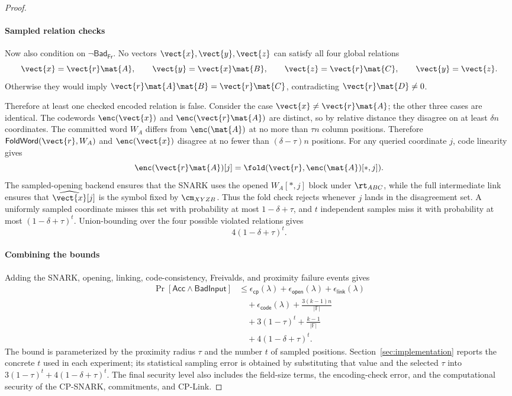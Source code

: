 \begin{proof}
\paragraph{Sampled relation checks}
Now also condition on \(\neg\mathsf{Bad}_{\mathsf{Fr}}\).  No vectors
\(\vect{x},\vect{y},\vect{z}\) can satisfy all four global relations
\[
  \vect{x}=\vect{r}\mat{A},
  \qquad
  \vect{y}=\vect{x}\mat{B},
  \qquad
  \vect{z}=\vect{r}\mat{C},
  \qquad
  \vect{y}=\vect{z}.
\]
Otherwise they would imply
\(\vect{r}\mat{A}\mat{B}=\vect{r}\mat{C}\), contradicting
\(\vect{r}\mat{D}\neq 0\).

Therefore at least one checked encoded relation is false.  Consider the case
\(\vect{x}\neq\vect{r}\mat{A}\); the other three cases are identical.  The
codewords \(\enc(\vect{x})\) and \(\enc(\vect{r}\mat{A})\) are distinct, so by
relative distance they disagree on at least \(\delta n\) coordinates.  The
committed word \(W_A\) differs from \(\enc(\mat{A})\) at no more than
\(\tau n\) column positions.  Therefore
\(\mathsf{FoldWord}(\vect{r},W_A)\) and \(\enc(\vect{x})\) disagree at no
fewer than \((\delta-\tau)n\) positions.  For any queried coordinate \(j\),
code linearity gives
\[
  \enc(\vect{r}\mat{A})[j]
  =
  \fold(\vect{r},\enc(\mat{A})[*,j]).
\]
The sampled-opening backend ensures that the SNARK uses the opened
\(W_A[*,j]\) block under \(\rt_{ABC}\), while the full intermediate link
ensures that \(\widehat{\vect{x}}[j]\) is the symbol fixed by
\(\cm_{XYZB}\).  Thus the fold check
rejects whenever \(j\) lands in the disagreement set.  A uniformly sampled
coordinate misses this set with probability at most \(1-\delta+\tau\), and
\(t\) independent samples miss it with probability at most
\((1-\delta+\tau)^t\).
Union-bounding over the four possible violated relations gives
\[
  4(1-\delta+\tau)^t .
\]

\paragraph{Combining the bounds}
Adding the SNARK, opening, linking, code-consistency, Freivalds, and proximity
failure events gives
\[
\begin{aligned}
\Pr[\mathsf{Acc}\land\mathsf{BadInput}]
&\le
\epsilon_{\mathsf{cp}}(\lambda)
+\epsilon_{\mathsf{open}}(\lambda)
+\epsilon_{\mathsf{link}}(\lambda)\\
&\quad+\epsilon_{\mathsf{code}}(\lambda)
+\frac{3(k-1)n}{|\mathbb F|}\\
&\quad+3(1-\tau)^t
+\frac{k-1}{|\mathbb{F}|}\\
&\quad+4(1-\delta+\tau)^t .
\end{aligned}
\]
The bound is parameterized by the proximity radius \(\tau\) and the number
\(t\) of sampled positions.  Section~\ref{sec:implementation} reports the
concrete \(t\) used in each experiment; its statistical sampling error is
obtained by substituting that value and the selected \(\tau\) into
\(3(1-\tau)^t+4(1-\delta+\tau)^t\).  The final security level also includes
the field-size terms, the encoding-check error, and the computational security
of the CP-SNARK, commitments, and CP-Link.


\end{proof}

